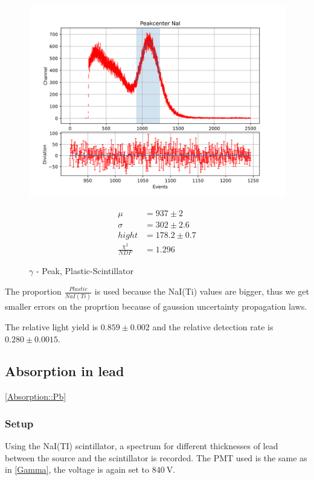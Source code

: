 \documentclass[12pt,twoside,a4paper]{scrartcl}
\begin{document}
			\begin{figure}[H]
					\begin{minipage}{0.69 \textwidth}
						\includegraphics[width = \textwidth]{Plots/Scinti/PeakNaIBest.png}
					\end{minipage}
					\begin{minipage}{0.29 \textwidth}
						\begin{align*}
							\mu &= 937 \pm 2 \\
							\sigma &= 302 \pm 2.6 \\
                            hight &= 178.2 \pm 0.7 \\
							\frac{\chi^2}{NDF} &= 1.296
						\end{align*}
					\end{minipage}
                    \caption{$\gamma$ - Peak, Plastic-Scintillator}
				\end{figure}

            The proportion $\frac{Plastic}{NaI(Ti)}$ is used because the NaI(Ti)
            values are bigger, thus we get smaller errors on the proprtion because
            of gaussion uncertainty propagation laws.

            The relative light yield is $0.859 \pm 0.002$ and the relative detection
            rate is $0.280 \pm 0.0015$.
	\subsection{Absorption in lead}
	\ref{Absorption::Pb}
		\subsubsection{Setup}
			Using the NaI(TI) scintillator, a spectrum for different thicknesses of lead between the source and the scintillator is recorded. The PMT used is the same as in \ref{Gamma}, the voltage is again set to $\SI{840}{\volt}$.
\end{document}
